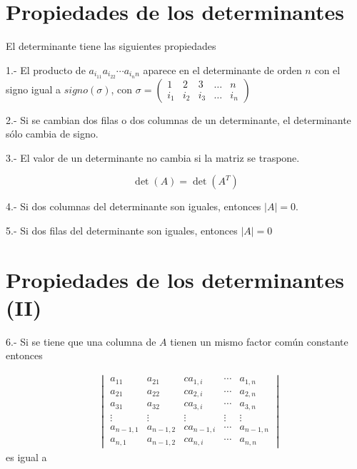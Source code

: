 \documentclass[
]{article}
\begin{document}
\hypertarget{propiedades-de-los-determinantes}{%
\section{Propiedades de los
determinantes}\label{propiedades-de-los-determinantes}}

El determinante tiene las siguientes propiedades

1.- El producto de \(a_{i_11}a_{i_22}\cdots a_{i_nn}\) aparece en el
determinante de orden \(n\) con el signo igual a \(signo(\sigma)\), con
\(\sigma = \begin{pmatrix} 1 & 2 & 3 & \dots & n \\ i_1 & i_2 & i_3 & \dots & i_n \end{pmatrix}\)

2.- Si se cambian dos filas o dos columnas de un determinante, el
determinante sólo cambia de signo.

3.- El valor de un determinante no cambia si la matriz se traspone.

\[
\det(A) = \det(A^{T})
\]

4.- Si dos columnas del determinante son iguales, entonces \(|A| = 0\).

5.- Si dos filas del determinante son iguales, entonces \(|A| = 0\)

\hypertarget{propiedades-de-los-determinantes-ii}{%
\section{Propiedades de los determinantes
(II)}\label{propiedades-de-los-determinantes-ii}}

6.- Si se tiene que una columna de \(A\) tienen un mismo factor común
constante entonces

\begin{equation*}
\begin{array}{cc}
 &  \begin{vmatrix} 
     a_{11}     & a_{21}      & ca_{1,i}     & \cdots     & a_{1,n}      \\ 
     a_{21}     & a_{22}      & ca_{2,i}     & \cdots     & a_{2,n}      \\
     a_{31}     &  a_{32}     & ca_{3,i}     &  \cdots    & a_{3,n}      \\
    \vdots      & \vdots      & \vdots       & \vdots     & \vdots \\
     a_{n-1,1}  & a_{n-1,2}   & ca_{n-1,i}   & \cdots     & a_{n-1,n}      \\
     a_{n,1}     &  a_{n-1,2} & ca_{n,i}     & \cdots     & a_{n,n}
  \end{vmatrix}
\end{array}
\end{equation*} es igual a
\end{document}
